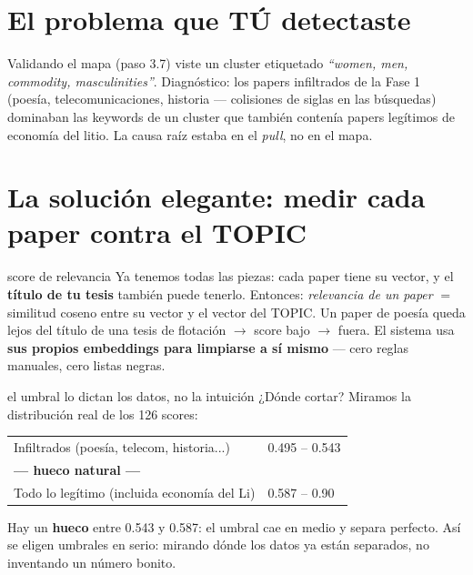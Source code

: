 \documentclass[11pt,a4paper]{article}
\begin{document}

\section{El problema que TÚ detectaste}

Validando el mapa (paso 3.7) viste un cluster etiquetado \emph{``women, men, commodity,
masculinities''}. Diagnóstico: los papers infiltrados de la Fase 1 (poesía, telecomunicaciones,
historia --- colisiones de siglas en las búsquedas) dominaban las keywords de un cluster que
también contenía papers legítimos de economía del litio. La causa raíz estaba en el
\emph{pull}, no en el mapa.

\section{La solución elegante: medir cada paper contra el TOPIC}

\begin{concepto}{score de relevancia}
Ya tenemos todas las piezas: cada paper tiene su vector, y el \textbf{título de tu tesis}
también puede tenerlo. Entonces: \emph{relevancia de un paper} $=$ similitud coseno entre su
vector y el vector del TOPIC. Un paper de poesía queda lejos del título de una tesis de
flotación $\rightarrow$ score bajo $\rightarrow$ fuera. El sistema usa \textbf{sus propios
embeddings para limpiarse a sí mismo} --- cero reglas manuales, cero listas negras.
\end{concepto}

\begin{concepto}{el umbral lo dictan los datos, no la intuición}
¿Dónde cortar? Miramos la distribución real de los 126 scores:
\begin{center}
\begin{tabular}{ll}
Infiltrados (poesía, telecom, historia...) & 0.495 -- 0.543 \\
\textbf{--- hueco natural ---} & \\
Todo lo legítimo (incluida economía del Li) & 0.587 -- 0.90 \\
\end{tabular}
\end{center}
Hay un \textbf{hueco} entre 0.543 y 0.587: el umbral 
cae en medio y separa perfecto. Así se eligen umbrales en serio: mirando dónde los datos ya
están separados, no inventando un número bonito.
\end{concepto}
\end{document}
